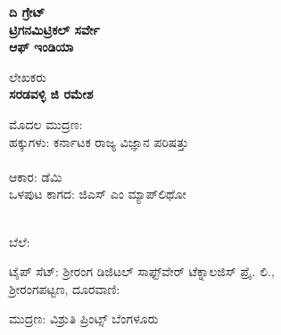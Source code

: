 \thispagestyle{empty}

\begin{center}
\textbf{ದಿ ಗ್ರೇಟ್​}\\\textbf{ಟ್ರಿಗನಮಿಟ್ರಿಕಲ್​ ಸರ್ವೇ}\\\textbf{ಆಫ್​ ಇಂಡಿಯಾ}
\end{center}

\vfill

\begin{center}
ಲೇಖಕರು\\\textbf{ಸರಡವಳ್ಳಿ ಜಿ ರಮೇಶ}
\end{center}

\vfill







\vfill

\begin{center}
ಮೊದಲ ಮುದ್ರಣ: \\ಹಕ್ಕುಗಳು: ಕರ್ನಾಟಕ ರಾಜ್ಯ ವಿಜ್ಞಾನ ಪರಿಷತ್ತು\\\\ಆಕಾರ:  ಡೆಮಿ\\ಒಳಪುಟ ಕಾಗದ:  ಜಿಎಸ್​ ಎಂ ಮ್ಯಾಪ್​ಲಿಥೋ
\end{center}

\begin{center}
\\ಬೆಲೆ: 
\end{center}

\begin{center}
ಟೈಪ್​ ಸೆಟ್​: ಶ‍್ರೀರಂಗ ಡಿಜಿಟಲ್​ ಸಾಫ್ಟ್​ವೇರ್ ​ಟೆಕ್ನಾಲಜಿಸ್​ ಪ್ರೈ. ಲಿ.,\\ಶ‍್ರೀರಂಗಪಟ್ಟಣ, ದೂರವಾಣಿ: 
\end{center}

\begin{center}
ಮುದ್ರಣ: ವಿಶ್ರುತಿ ಪ್ರಿಂಟ್ಸ್ ಬೆಂಗಳೂರು
\end{center}


